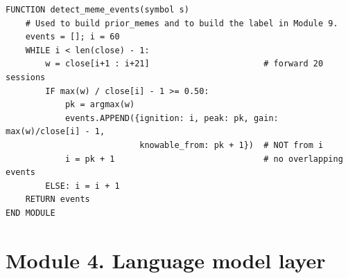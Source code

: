 \documentclass[10pt]{article}
\begin{document}
\begin{lstlisting}
FUNCTION detect_meme_events(symbol s)
    # Used to build prior_memes and to build the label in Module 9.
    events = []; i = 60
    WHILE i < len(close) - 1:
        w = close[i+1 : i+21]                       # forward 20 sessions
        IF max(w) / close[i] - 1 >= 0.50:
            pk = argmax(w)
            events.APPEND({ignition: i, peak: pk, gain: max(w)/close[i] - 1,
                           knowable_from: pk + 1})  # NOT from i
            i = pk + 1                              # no overlapping events
        ELSE: i = i + 1
    RETURN events
END MODULE
\end{lstlisting}

\section{Module 4. Language model layer}
\end{document}
